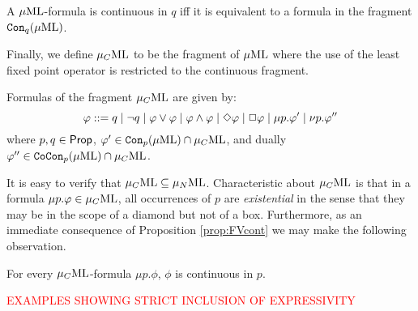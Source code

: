 \begin{proposition}\label{prop:FVcont}
A $\mu\mathrm{ML}$-formula is continuous in $q$ iff it is equivalent to a formula in the
fragment $\mathtt{Con}_{q}(\mu\mathrm{ML})$.
\end{proposition}

Finally, we define $\mu_{C}\mathrm{ML}$ to be the fragment of $\mu\mathrm{ML}$ where the use of the
least fixed point operator is restricted to the continuous fragment. 

\begin{definition}
Formulas of the fragment $\mu_{C}\mathrm{ML}$ are given by:%
\begin{equation*}
   \varphi \mathrel{::=}  q \mid \lnot q
    \mid \varphi \lor \varphi
        \mid \varphi \land \varphi
    \mid \Diamond \varphi
     \mid \Box \varphi \mid
    \mu p.\varphi' 
    \mid \nu p.\varphi''
    \end{equation*}
%
where $p,q \in \mathsf{Prop}$,  $\varphi' \in \mathtt{Con}_{p}(\mu\mathrm{ML}) \cap \mu_{C}\mathrm{ML}$, and dually 
$\varphi'' \in \mathtt{CoCon}_{p}(\mu\mathrm{ML}) \cap \mu_{C}\mathrm{ML}$.
\end{definition}


It is easy to verify that $\mu_{C}\mathrm{ML} \subseteq \mu_{N}\mathrm{ML}$.
Characteristic about $\mu_{C}\mathrm{ML}$ is that in a formula $\mu p. \varphi \in \mu_{C}\mathrm{ML}$,
all occurrences of $p$ are \emph{existential} in the sense that they may be 
in the scope of a diamond but not of a box.
Furthermore, as an immediate consequence of Proposition \ref{prop:FVcont} we 
may make the following observation.

\begin{corollary}\label{cor:cont}
For every $\mu_{C}\mathrm{ML}$-formula $\mu p. \phi$, $\phi$ is continuous in $p$.
\end{corollary}

\btbs
\item
\textcolor{red}{EXAMPLES SHOWING STRICT INCLUSION OF EXPRESSIVITY}
\etbs
